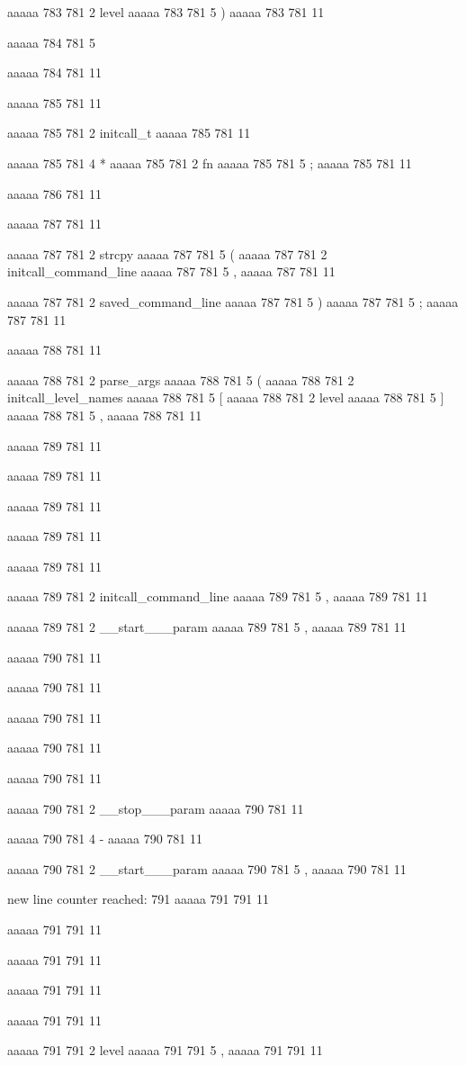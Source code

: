 aaaaa 783 781
2
level
aaaaa 783 781
5
)
aaaaa 783 781
11


aaaaa 784 781
5
{
aaaaa 784 781
11


aaaaa 785 781
11
	
aaaaa 785 781
2
initcall_t
aaaaa 785 781
11
 
aaaaa 785 781
4
*
aaaaa 785 781
2
fn
aaaaa 785 781
5
;
aaaaa 785 781
11


aaaaa 786 781
11


aaaaa 787 781
11
	
aaaaa 787 781
2
strcpy
aaaaa 787 781
5
(
aaaaa 787 781
2
initcall_command_line
aaaaa 787 781
5
,
aaaaa 787 781
11
 
aaaaa 787 781
2
saved_command_line
aaaaa 787 781
5
)
aaaaa 787 781
5
;
aaaaa 787 781
11


aaaaa 788 781
11
	
aaaaa 788 781
2
parse_args
aaaaa 788 781
5
(
aaaaa 788 781
2
initcall_level_names
aaaaa 788 781
5
[
aaaaa 788 781
2
level
aaaaa 788 781
5
]
aaaaa 788 781
5
,
aaaaa 788 781
11


aaaaa 789 781
11
	
aaaaa 789 781
11
	
aaaaa 789 781
11
 
aaaaa 789 781
11
 
aaaaa 789 781
11
 
aaaaa 789 781
2
initcall_command_line
aaaaa 789 781
5
,
aaaaa 789 781
11
 
aaaaa 789 781
2
__start___param
aaaaa 789 781
5
,
aaaaa 789 781
11


aaaaa 790 781
11
	
aaaaa 790 781
11
	
aaaaa 790 781
11
 
aaaaa 790 781
11
 
aaaaa 790 781
11
 
aaaaa 790 781
2
__stop___param
aaaaa 790 781
11
 
aaaaa 790 781
4
-
aaaaa 790 781
11
 
aaaaa 790 781
2
__start___param
aaaaa 790 781
5
,
aaaaa 790 781
11


new line counter reached: 791
aaaaa 791 791
11
	
aaaaa 791 791
11
	
aaaaa 791 791
11
 
aaaaa 791 791
11
 
aaaaa 791 791
11
 
aaaaa 791 791
2
level
aaaaa 791 791
5
,
aaaaa 791 791
11
 
}
